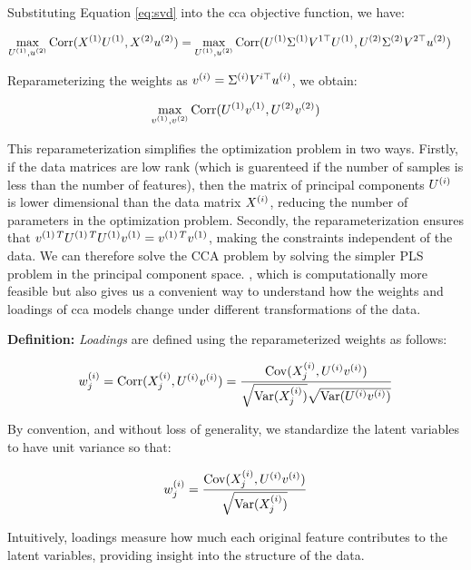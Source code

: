 Substituting Equation \ref{eq:svd} into the \acrshort{cca} objective function, we have:

\begin{align}
    \max_{U^{(1)}, u^{(2)}} \operatorname{Corr}(X^{(1)}U^{(1)}, X^{(2)}u^{(2)}) &= \max_{U^{(1)}, u^{(2)}} \operatorname{Corr}(U^{(1)}\Sigma^{(1)}V^{1\top}U^{(1)}, U^{(2)}\Sigma^{(2)}V^{2\top}u^{(2)}) \label{eq:cca_obj}
\end{align}

Reparameterizing the weights as $v^{(i)} = \Sigma^{(i)}V^{i\top}u^{(i)}$, we obtain:

\begin{align}
    \max_{v^{(1)}, v^{(2)}} \operatorname{Corr}(U^{(1)}v^{(1)}, U^{(2)}v^{(2)}) \label{eq:reparam}
\end{align}

This reparameterization simplifies the optimization problem in two ways.
Firstly, if the data matrices are low rank (which is guarenteed if the number of samples is less than the number of features), then the matrix of principal components $U^{(i)}$ is lower dimensional than the data matrix $X^{(i)}$, reducing the number of parameters in the optimization problem.
Secondly, the reparameterization ensures that $v^{(1)\,T}U^{(1)\,T}U^{(1)}v^{(1)}=v^{(1)\,T}v^{(1)}$, making the constraints independent of the data.
We can therefore solve the CCA problem by solving the simpler PLS problem in the principal component space.
, which is computationally more feasible but also gives us a convenient way to understand how the weights and \gls{loadings} of \acrshort{cca} models change under different transformations of the data.

\textbf{Definition:} \textit{Loadings} are defined using the reparameterized weights as follows:

\begin{align}
    w^{(i)}_j = \operatorname{Corr}(X^{(i)}_j, U^{(i)}v^{(i)}) = \frac{\mathrm{Cov}(X^{(i)}_j, U^{(i)}v^{(i)})}{\sqrt{\mathrm{Var}(X^{(i)}_j)}\sqrt{\mathrm{Var}(U^{(i)}v^{(i)})}} \label{eq:loading_def}
\end{align}

By convention, and without loss of generality, we standardize the latent variables to have unit variance so that:

\begin{align}
    w^{(i)}_j = \frac{\mathrm{Cov}(X^{(i)}_j, U^{(i)}v^{(i)})}{\sqrt{\mathrm{Var}(X^{(i)}_j)}} \label{eq:standardized_loading}
\end{align}

Intuitively, \gls{loadings} measure how much each original feature contributes to the latent variables, providing insight into the structure of the data.


